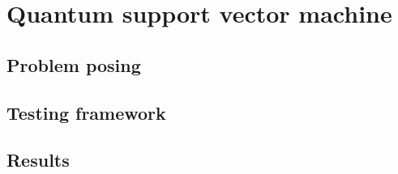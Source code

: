 \section[QSVM]{Quantum support vector machine}
\label{sec:qsvm}

\subsection{Problem posing}

\subsection{Testing framework}

\subsection{Results}